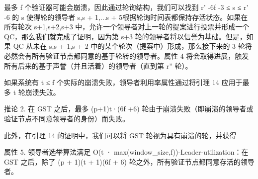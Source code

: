 最多 f 个验证器可能会崩溃，因此通过轮询结构，我们可以找到 r' -6f -3 ≤ s ≤ r' -6 的 s 使得轮的领导者 s,s + 1,...s + 5根据轮询时间表都保持存活状态。如果在所有轮次 s+1,s+2,s+3 中，允许一个领导者对上一轮的提案进行投票并形成一个 QC，那么我们就完成了证明，因为第 s+3 轮的领导者将以信誉为基础。但是，如果 QC 从未在 s,s + 1,s + 2 中的某个轮次（提案中）形成，那么接下来的 3 轮将必然会有所有验证节点都同意的基于轮转的领导者。属性 4 将会取得进展，触发所有后来的基于声誉（并且活着）的领导者（直到第 r'' 轮）。

如果系统有 t ≤ f 个实际的崩溃失败，领导者利用率属性通过将引理 14 应用于最多 t 轮崩溃失败。

推论 2. 在 GST 之后，最多 (p+1)t·(6f +6) 轮由于崩溃失败（即崩溃的领导者或验证节点不同意领导者的身份）而失败。

此外，在引理 14 的证明中，我们可以将 GST 轮视为具有崩溃的轮，并获得

属性 5. 领导者选举算法满足 O(t · max(window\_size,f))-Leader-utilization：在 GST 之后，除了 (p + 1)(t + 1)(6f + 6) 轮之外，所有验证节点都同意存活的领导者。